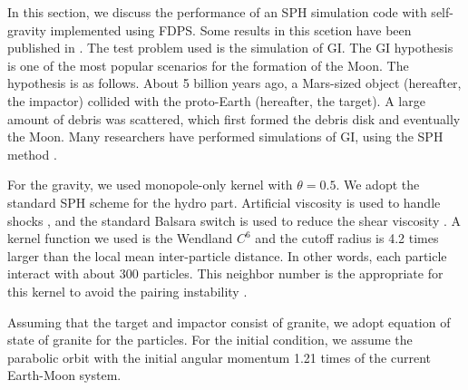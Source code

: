 In this section, we discuss the performance of an SPH simulation code
with self-gravity implemented using FDPS.  Some results in this
scetion have been published in \citet{2015FDPS}.  The test problem
used is the simulation of GI. The GI
hypothesis \citep{1975Icar...24..504H, 1976LPI.....7..120C} is one of
the most popular scenarios for the formation of the Moon. The
hypothesis is as follows. About 5 billion years ago, a Mars-sized
object (hereafter, the impactor) collided with the proto-Earth
(hereafter, the target). A large amount of debris was scattered, which
first formed the debris disk and eventually the Moon. Many researchers
have performed simulations of GI, using the SPH method
\citep{1986Icar...66..515B, 2013Icar..222..200C, 2014NatGe...7..564A}.

For the gravity, we used monopole-only kernel with $\theta=0.5$. We
adopt the standard SPH scheme
\citep{1992ARA&A..30..543M, 2009NewAR..53...78R, 2010ARA&A..48..391S}
for the hydro part. Artificial viscosity is used to handle shocks
\citep{1997JCoPh.136..298M}, and 
the standard Balsara switch is used to reduce the shear viscosity
\citep{1995JCoPh.121..357B}. A kernel function we used is the Wendland $C^6$ and the cutoff radius
is 4.2 times larger than the local mean inter-particle distance. In
other words, each particle interact with about 300 particles. This
neighbor number is the appropriate for this kernel to avoid the
pairing instability \citep{2012MNRAS.425.1068D}.




Assuming that the target and impactor consist of granite, we adopt
equation of state of granite \citep{1986Icar...66..515B} for the
particles. For the initial condition, we assume the parabolic orbit
with the initial angular momentum 1.21 times of the current Earth-Moon
system.


